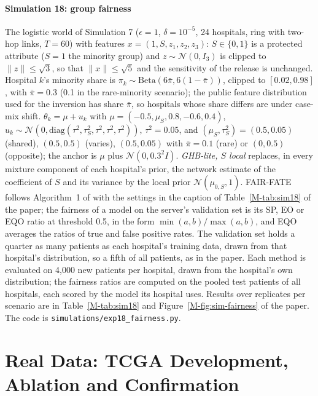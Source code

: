 \documentclass[acmsmall,screen,nonacm]{acmart}
\theoremstyle{acmdefinition}
\begin{document}
\paragraph{Simulation 18: group fairness} The logistic world of Simulation 7 ($\epsilon=1$, $\delta=10^{-5}$, 24 hospitals, ring with two-hop links, $T=60$) with features $x=(1,S,z_1,z_2,z_3)$: $S\in\{0,1\}$ is a protected attribute ($S=1$ the minority group) and $z\sim\mathcal{N}(0,I_3)$ is clipped to $\|z\|\le\sqrt{3}$, so that $\|x\|\le\sqrt{5}$ and the sensitivity of the release is unchanged. Hospital $k$'s minority share is $\pi_k\sim\mathrm{Beta}(6\bar\pi,6(1-\bar\pi))$, clipped to $[0.02,0.98]$, with $\bar\pi=0.3$ (0.1 in the rare-minority scenario); the public feature distribution used for the inversion has share $\bar\pi$, so hospitals whose share differs are under case-mix shift. $\theta_k=\mu+u_k$ with $\mu=(-0.5,\mu_S,0.8,-0.6,0.4)$, $u_k\sim\mathcal{N}(0,\mathrm{diag}(\tau^2,\tau_S^2,\tau^2,\tau^2,\tau^2))$, $\tau^2=0.05$, and $(\mu_S,\tau_S^2)=(0.5,0.05)$ (shared), $(0.5,0.5)$ (varies), $(0.5,0.05)$ with $\bar\pi=0.1$ (rare) or $(0,0.5)$ (opposite); the anchor is $\mu$ plus $\mathcal{N}(0,0.3^2I)$. \emph{GHB-lite, $S$ local} replaces, in every mixture component of each hospital's prior, the network estimate of the coefficient of $S$ and its variance by the local prior $\mathcal{N}(\mu_{0,S},1)$. FAIR-FATE follows Algorithm~1 of \cite{salazar2023fairfate} with the settings in the caption of Table~\ref{M-tab:sim18} of the paper; the fairness of a model on the server's validation set is its SP, EO or EQO ratio at threshold 0.5, in the form $\min(a,b)/\max(a,b)$, and EQO averages the ratios of true and false positive rates. The validation set holds a quarter as many patients as each hospital's training data, drawn from that hospital's distribution, so a fifth of all patients, as in the paper. Each method is evaluated on 4,000 new patients per hospital, drawn from the hospital's own distribution; the fairness ratios are computed on the pooled test patients of all hospitals, each scored by the model its hospital uses. Results over \SimEighteenReps{} replicates per scenario are in Table~\ref{M-tab:sim18} and Figure~\ref{M-fig:sim-fairness} of the paper. The code is \texttt{simulations/exp18\_fairness.py}.

\section{Real Data: TCGA Development, Ablation and Confirmation}\label{sec:tcga}
\end{document}
